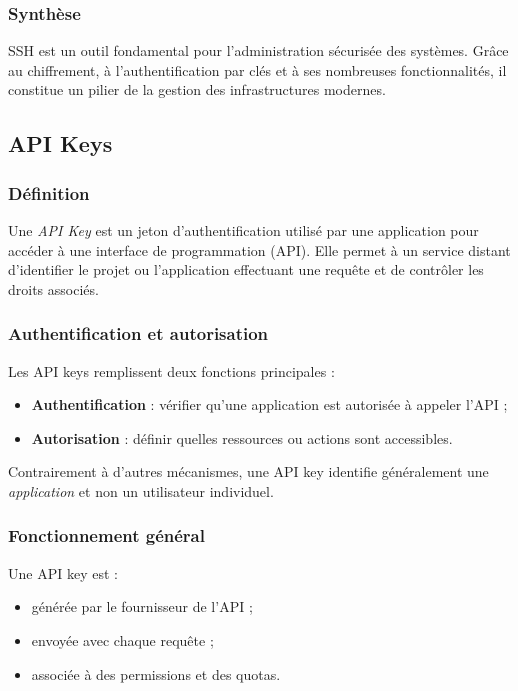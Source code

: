\documentclass{article}
\begin{document}
\subsubsection{Synthèse}

SSH est un outil fondamental pour l’administration sécurisée des systèmes.  
Grâce au chiffrement, à l’authentification par clés et à ses nombreuses fonctionnalités, il constitue un pilier de la gestion des infrastructures modernes.


\subsection{API Keys}

\subsubsection{Définition}

Une \emph{API Key} est un jeton d’authentification utilisé par une application pour accéder à une interface de programmation (API).  
Elle permet à un service distant d’identifier le projet ou l’application effectuant une requête et de contrôler les droits associés.

\subsubsection{Authentification et autorisation}

Les API keys remplissent deux fonctions principales :
\begin{itemize}
    \item \textbf{Authentification} : vérifier qu’une application est autorisée à appeler l’API ;
    \item \textbf{Autorisation} : définir quelles ressources ou actions sont accessibles.
\end{itemize}

Contrairement à d’autres mécanismes, une API key identifie généralement une \emph{application} et non un utilisateur individuel.

\subsubsection{Fonctionnement général}

Une API key est :
\begin{itemize}
    \item générée par le fournisseur de l’API ;
    \item envoyée avec chaque requête ;
    \item associée à des permissions et des quotas.
\end{itemize}
\end{document}
